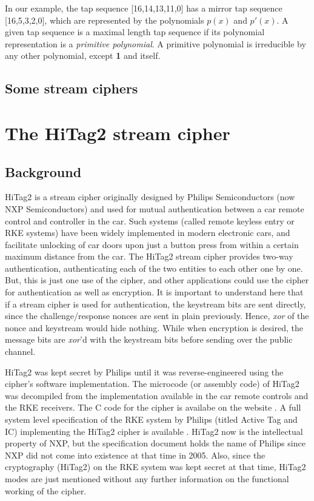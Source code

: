 In our example, the tap sequence [16,14,13,11,0] has a mirror tap sequence [16,5,3,2,0], which are represented by the polynomials $p(x)$ and $p'(x)$. A given tap sequence is a maximal length tap sequence if its polynomial representation is a \emph{primitive polynomial}. A primitive polynomial is irreducible by any other polynomial, except \textbf{1} and itself. 

\subsection{Some stream ciphers}

\section{The HiTag2 stream cipher}
\label{sec:hitag2}

\subsection{Background}
\label{sec:hitag2-background}
HiTag2 is a stream cipher originally designed by Philips Semiconductors (now NXP Semiconductors) and used for mutual authentication between a car remote control and controller in the car. Such systems (called remote keyless entry or RKE systems) have been widely implemented in modern electronic cars, and facilitate unlocking of car doors upon just a button press from within a certain maximum distance from the car. The HiTag2 stream cipher provides two-way authentication, authenticating each of the two entities to each other one by one. But, this is just one use of the cipher, and other applications could use the cipher for authentication as well as encryption. It is important to understand here that if a stream cipher is used for authentication, the keystream bits are sent directly, since the challenge/response nonces are sent in plain previously. Hence, \emph{xor} of the nonce and keystream would hide nothing. While when encryption is desired, the message bits are \emph{xor}'d with the keystream bits before sending over the public channel. 

HiTag2 was kept secret by Philips until it was reverse-engineered using the cipher's software implementation. The microcode (or assembly code) of HiTag2 was decompiled from the implementation available in the car remote controls and the RKE receivers. The C code for the cipher is availabe on the website \cite{hitag2-code}. A full system level specification of the RKE system by Philips (titled Active Tag and IC) implementing the HiTag2 cipher is available \cite{active-tag-datasheet}. HiTag2 now is the intellectual property of NXP, but the specification document holds the name of Philips since NXP did not come into existence at that time in 2005. Also, since the cryptography (HiTag2) on the RKE system was kept secret at that time, HiTag2 modes are just mentioned without any further information on the functional working of the cipher.

